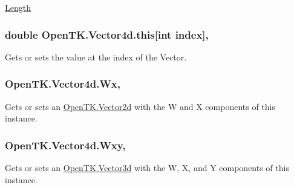 \hyperlink{struct_open_t_k_1_1_vector4d_ab9f920535e4630430c8b2a6affcdb6a4}{Length} \hypertarget{struct_open_t_k_1_1_vector4d_a7d7ef511863616a944237df2b6d4a898}{
\subsubsection[{this[int index]}]{\setlength{\rightskip}{0pt plus 5cm}double Open\-T\-K.\-Vector4d.\-this\mbox{[}int index\mbox{]}\hspace{0.3cm}{\ttfamily [get]}, {\ttfamily [set]}}}\label{struct_open_t_k_1_1_vector4d_a7d7ef511863616a944237df2b6d4a898}


Gets or sets the value at the index of the Vector. 

\hypertarget{struct_open_t_k_1_1_vector4d_a6659b3cfd08b22fc6bd30ca60dd2b5eb}{
\subsubsection[{Wx}]{ Open\-T\-K.\-Vector4d.\-Wx\hspace{0.3cm}{\ttfamily [get]}, {\ttfamily [set]}}}\label{struct_open_t_k_1_1_vector4d_a6659b3cfd08b22fc6bd30ca60dd2b5eb}


Gets or sets an \hyperlink{struct_open_t_k_1_1_vector2d}{Open\-T\-K.\-Vector2d} with the W and X components of this instance. 

\hypertarget{struct_open_t_k_1_1_vector4d_addb3d11762322adf2c943c04ead56c8c}{
\subsubsection[{Wxy}]{ Open\-T\-K.\-Vector4d.\-Wxy\hspace{0.3cm}{\ttfamily [get]}, {\ttfamily [set]}}}\label{struct_open_t_k_1_1_vector4d_addb3d11762322adf2c943c04ead56c8c}


Gets or sets an \hyperlink{struct_open_t_k_1_1_vector3d}{Open\-T\-K.\-Vector3d} with the W, X, and Y components of this instance. 

